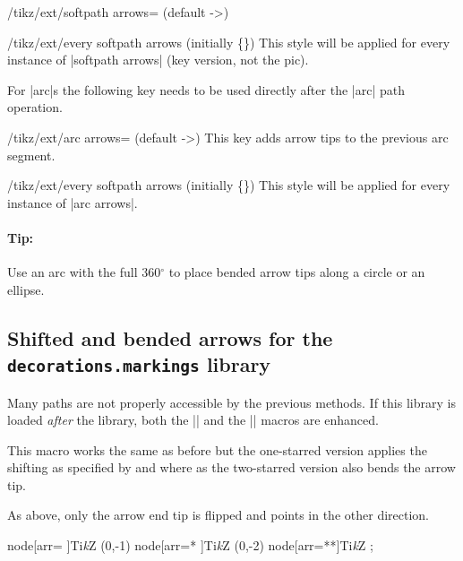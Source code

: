 \begin{multicols}{2}
\begin{key}{/tikz/ext/softpath arrows= (default ->)}
\begin{stylekey}{/tikz/ext/every softpath arrows (initially \{\})}
This style will be applied for every instance of |softpath arrows| (key version, not the pic).
\end{stylekey}
\end{key}

For |arc|s the following key needs to be used directly after the |arc| path operation.
\begin{key}{/tikz/ext/arc arrows= (default ->)}
This key adds arrow tips to the previous arc segment.
\begin{stylekey}{/tikz/ext/every softpath arrows (initially \{\})}
This style will be applied for every instance of |arc arrows|.
\end{stylekey}

\paragraph{Tip:}
Use an arc with the full 360${}^\circ$ to place bended arrow tips along a circle or an ellipse.
\end{key}
\subsection{Shifted and bended arrows for the \texttt{decorations.markings} library}
Many paths are not properly accessible by the previous methods.
If this library is loaded \emph{after}
the  library,
both the |\arrow| and the |\arrowreversed| macros are enhanced.

\begin{command}{\arrow{}}
  This macro works the same as before but the one-starred version
  applies the shifting as specified
  by  and 
  where as the two-starred version also bends the arrow tip.
\end{command}
\begin{command}{\arrowreversed{}}
  As above, only the arrow end tip is flipped and points in the other direction.
\end{command}
\begin{codeexample}[width=2cm,preamble=\usetikzlibrary{bending, decorations.markings, ext.arrows-plus}]
\tikz[y=1.5cm, >=Stealth, arrows={[round]}, nodes={circle, draw}]
  \path   node[arr=  ]{Ti\emph kZ} %
   (0,-1) node[arr=* ]{Ti\emph kZ} %
   (0,-2) node[arr=**]{Ti\emph kZ} %
  ;
\end{codeexample}
\end{multicols}
\endinput